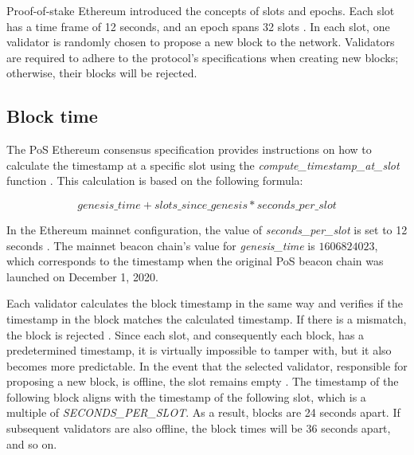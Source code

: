 Proof-of-stake Ethereum introduced the concepts of slots and epochs. Each slot
has a time frame of 12 seconds, and an epoch spans 32 slots
\cite{seconds-per-slot-mainnet}\cite{seconds-per-slot-mainnet-doc}. In each
slot, one validator is randomly chosen to propose a new block to the network.
Validators are required to adhere to the protocol's specifications when
creating new blocks; otherwise, their blocks will be rejected.

\subsection{Block time}

The PoS Ethereum consensus specification provides instructions on how to
calculate the timestamp at a specific slot using the
\textit{compute\_timestamp\_at\_slot} function \cite{compute-timestamp-at-slot}.
This calculation is based on the following formula:

\begin{equation}
genesis\_time + slots\_since\_genesis *
seconds\_per\_slot
\end{equation}


In the Ethereum mainnet configuration, the value of \textit{seconds\_per\_slot} is set to
12 seconds \cite{seconds-per-slot-mainnet} \cite{seconds-per-slot-mainnet-doc}.
The mainnet beacon chain's value for \textit{genesis\_time} is $1606824023$, which
corresponds to the timestamp when the original PoS beacon chain was launched on
December 1, 2020.

Each validator calculates the block timestamp in the same way and verifies if
the timestamp in the block matches the calculated timestamp. If there is a
mismatch, the block is rejected \cite{process-execution-payload}. Since each
slot, and consequently each block, has a predetermined timestamp, it is
virtually impossible to tamper with, but it also becomes more predictable. In
the event that the selected validator, responsible for proposing a new block,
is offline, the slot remains empty \cite{validator-offline}. The timestamp of
the following block aligns with the timestamp of the following slot, which is a
multiple of \textit{SECONDS\_PER\_SLOT}. As a result, blocks are 24 seconds
apart. If subsequent validators are also offline, the block times will be 36
seconds apart, and so on.


